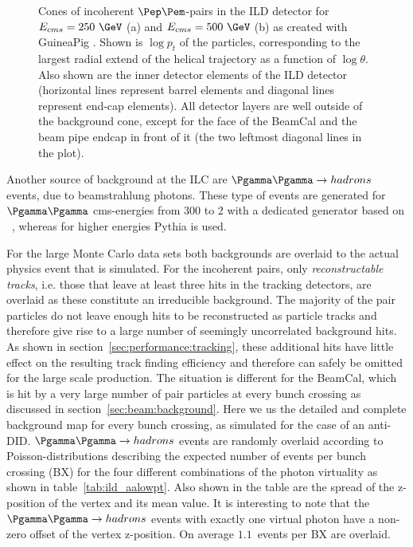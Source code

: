 \begin{figure}[b!]
\begin{subfigure}{0.49\hsize}
    \caption{ \label{fig:pair_bg_cone_500}}
  \end{subfigure}
\caption{\label{fig:pair_bg_cone} Cones of incoherent $\Pep\Pem$-pairs in the ILD detector for $E_{cms}=250~\GeV$ (a) and $E_{cms}=500~\GeV$ (b)
  as created with GuineaPig . Shown is $\log{p_t}$ of the particles,
  corresponding to the largest radial extend of the helical trajectory as a function of $\log{\theta}$.
  Also shown are the inner detector elements of the ILD detector (horizontal lines represent
  barrel elements and diagonal lines represent end-cap elements). All detector layers are well outside of the background cone,
  except for the face of the BeamCal and the beam pipe endcap in front of it (the two leftmost diagonal lines in the plot).}
\end{figure}
Another source of background at the ILC are $\Pgamma \Pgamma \to hadrons$ events, due to beamstrahlung photons.
These type of events are generated for $\Pgamma \Pgamma$ cms-energies from \unit{300}{\MeV} to \unit{2}{\GeV} with a dedicated generator based
on ~\cite{Chen:1993dba}, whereas for higher energies Pythia is used.


For the large Monte Carlo data sets both backgrounds are overlaid to the actual physics event that is simulated. For the incoherent pairs, only
\emph{reconstructable tracks}, i.e. those that leave at least three hits in the tracking detectors, are overlaid as these constitute an irreducible
background. The majority of the pair particles do not leave enough hits to be reconstructed as particle tracks and therefore give rise to a
large number of seemingly uncorrelated background hits. As shown in section~\ref{sec:performance:tracking}, these additional hits have little
effect on the resulting track finding efficiency and therefore can safely be omitted for the large scale production.
The situation is different for the BeamCal, which is hit by a very large number of pair particles at every bunch crossing as discussed in
section~\ref{sec:beam:background}. Here we us the detailed and complete background map for every bunch crossing, as simulated for the
case of an anti-DID.
$\Pgamma \Pgamma \to hadrons$ events are randomly overlaid according to Poisson-distributions describing the expected number of events per bunch
crossing (BX) for the four different combinations of the photon virtuality as shown in table~\ref{tab:ild_aalowpt}. Also shown in the table are
the spread of the z-position of the vertex and its mean value. It is interesting to note that the $\Pgamma \Pgamma \to hadrons$ events with exactly
one virtual photon have a non-zero offset of the vertex z-position. On average $1.1$~events per BX are overlaid.

